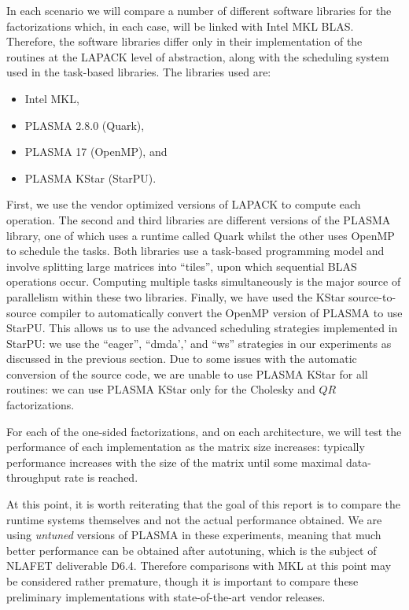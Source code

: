 \documentclass[a4paper,12pt]{article}
\begin{document}
In each scenario we will compare a number of different software libraries
for the factorizations which,
in each case,
will be linked with Intel MKL BLAS.
Therefore, the software libraries differ only in their
implementation of the routines at the LAPACK level of abstraction,
along with the scheduling system used in the task-based libraries.
The libraries used are:
\begin{itemize}
\item Intel MKL,
\item PLASMA 2.8.0 (Quark),
\item PLASMA 17 (OpenMP), and
\item PLASMA KStar (StarPU).
\end{itemize}

First,
we use the vendor optimized versions of LAPACK to compute each operation.
The second and third libraries are different versions of the PLASMA
library,
one of which uses a runtime called Quark whilst the other uses OpenMP
to schedule the tasks.
Both libraries use a task-based programming model and involve
splitting large matrices into ``tiles'',
upon which sequential BLAS operations occur.
Computing multiple tasks simultaneously is the major source of parallelism
within these two libraries.
Finally,
we have used the KStar source-to-source compiler to automatically
convert the OpenMP version of PLASMA to use StarPU.
This allows us to use the advanced scheduling strategies implemented
in StarPU:
we use the ``eager'', ``dmda',' and ``ws'' strategies in our
experiments as discussed in the previous section.
Due to some issues with the automatic conversion of the source code,
we are unable to use PLASMA KStar for all routines:
we can use PLASMA KStar only for the Cholesky and $QR$ factorizations.

For each of the one-sided factorizations,
and on each architecture,
we will test the performance of each implementation
as the matrix size increases:
typically performance increases with the size of the matrix until
some maximal data-throughput rate is reached.

At this point,
it is worth reiterating that the goal of this report is to
compare the runtime systems themselves
and not the actual performance obtained.
We are using \emph{untuned} versions of PLASMA in these experiments,
meaning that much better performance can be obtained
after autotuning,
which is the subject of NLAFET deliverable D6.4.
Therefore comparisons with MKL at this point
may be considered rather premature,
though it is important to compare these preliminary implementations
with state-of-the-art vendor releases.
\end{document}
